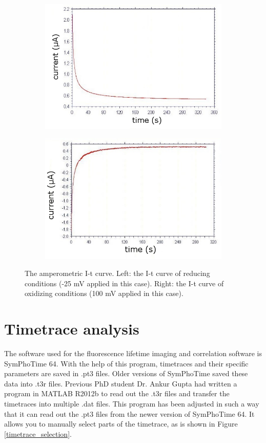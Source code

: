 \documentclass[twoside,single]{lion-msc}
\begin{document}
\begin{figure}[ht!]
\begin{subfigure}{.5\textwidth}
  \centering
  \includegraphics[width= \textwidth]{it25mV}

  \label{}
\end{subfigure}%
\begin{subfigure}{.5\textwidth}
  \centering
  \includegraphics[width=.95 \linewidth]{it100mV}
  \label{}
\end{subfigure}
\caption{The amperometric I-t curve.  Left: the I-t curve of reducing conditions (-25 mV applied in this case). Right: the I-t curve of oxidizing conditions (100 mV applied in this case).}
\label{it_curves}
\end{figure}


\section*{Timetrace analysis}\label{dats_colls}
The software used for the fluorescence lifetime imaging and correlation software is SymPhoTime 64. With the help of this program, timetraces and their specific parameters are saved in .pt3 files. Older versions of SymPhoTime saved these data into .t3r files. Previous PhD student Dr. Ankur Gupta had written a program in MATLAB R2012b to read out the .t3r files and transfer the timetraces into multiple .dat files. This program has been adjusted in such a way that it can read out the .pt3 files from the newer version of SymPhoTime 64. It allows you to manually select parts of the timetrace, as is shown in Figure \ref{timetrace_selection}.
\end{document}
